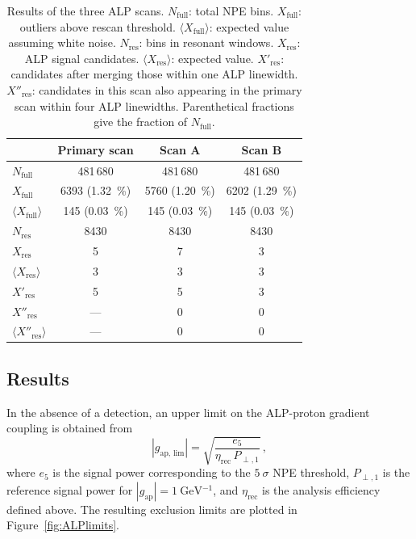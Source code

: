 \begin{table}[htb]
    \centering
    \caption{Results of the three ALP scans.
    $N_\mathrm{full}$: total NPE bins.
    $X_\mathrm{full}$: outliers above rescan threshold.
    $\langle X_\mathrm{full}\rangle$: expected value assuming white noise.
    $N_\mathrm{res}$: bins in resonant windows.
    $X_\mathrm{res}$: ALP signal candidates.
    $\langle X_\mathrm{res}\rangle$: expected value.
    $X'_\mathrm{res}$: candidates after merging those within one ALP linewidth.
    $X''_\mathrm{res}$: candidates in this scan also appearing in the primary scan within four ALP linewidths.
    Parenthetical fractions give the fraction of $N_\mathrm{full}$.}
    \label{tab:candidates}
    \begin{tabular}{lccc}
        \hline\hline
        & Primary scan & Scan A & Scan B \\
        \hline
        $N_\mathrm{full}$ & 481\,680 & 481\,680 & 481\,680 \\
        $X_\mathrm{full}$ & 6393 (\SI{1.32}{\%}) & 5760 (\SI{1.20}{\%}) & 6202 (\SI{1.29}{\%}) \\
        $\langle X_\mathrm{full}\rangle$ & 145 (\SI{0.03}{\%}) & 145 (\SI{0.03}{\%}) & 145 (\SI{0.03}{\%}) \\
        \hline
        $N_\mathrm{res}$ & 8430 & 8430 & 8430 \\
        $X_\mathrm{res}$ & 5 & 7 & 3 \\
        $\langle X_\mathrm{res}\rangle$ & 3 & 3 & 3 \\
        $X'_\mathrm{res}$ & 5 & 5 & 3 \\
        $X''_\mathrm{res}$ & --- & 0 & 0 \\
        $\langle X''_\mathrm{res}\rangle$ & --- & 0 & 0 \\
        \hline\hline
    \end{tabular}
\end{table}


\subsection{Results}\label{sec:results:MWALP20221223:results}

In the absence of a detection, an upper limit on the ALP-proton gradient coupling is obtained from
\begin{equation}
    |g_\mathrm{ap,\,lim}| = \sqrt{\frac{e_5}{\eta_\mathrm{rec}\,P_{\perp,1}}}
    \,,\label{eq:limcouple-2}
\end{equation}
where $e_5$ is the signal power corresponding to the $\SI{5}{\sigma}$ NPE threshold, $P_{\perp,1}$ is the reference signal power for $|g_\mathrm{ap}|=\SI{1}{\GeV^{-1}}$, and $\eta_\mathrm{rec}$ is the analysis efficiency defined above.
The resulting exclusion limits are plotted in Figure~\ref{fig:ALPlimits}.

